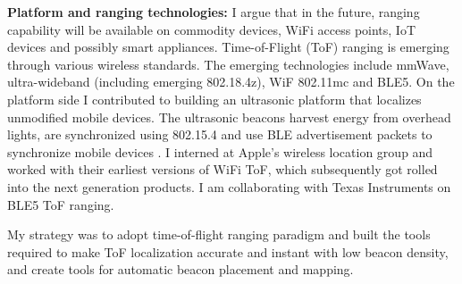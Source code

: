 \documentclass[10pt]{article}
\begin{document}
\textbf{Platform and ranging technologies:} I argue that in the future, ranging capability will be available on commodity devices, WiFi access points, IoT devices and possibly smart appliances. %
Time-of-Flight (ToF) ranging is emerging through various wireless standards. %
The emerging technologies include mmWave, ultra-wideband (including emerging 802.18.4z), WiF 802.11mc and BLE5. On the platform side I contributed to building an ultrasonic platform that localizes unmodified mobile devices. The ultrasonic beacons harvest energy from overhead lights, are synchronized using 802.15.4 and use BLE advertisement packets to synchronize mobile devices
\cite{rtas-alps-platform, lazik2015alps,lazik2015alpsdemo}. I interned at Apple's wireless location group and worked with their earliest versions of WiFi ToF, which subsequently got rolled into the next generation products. I am collaborating with Texas Instruments on BLE5 ToF ranging. 

My strategy was to adopt time-of-flight ranging paradigm and built the tools required to make ToF localization accurate and instant with low beacon density, and create tools for automatic beacon placement and mapping. %



\end{document}
